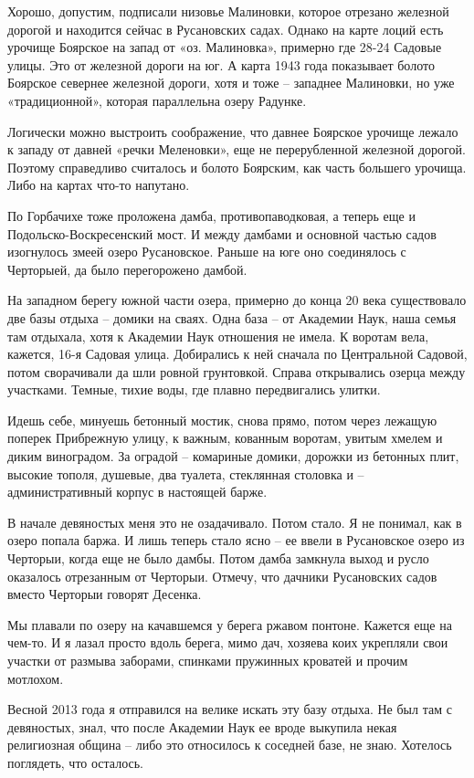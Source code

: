 Хорошо, допустим, подписали низовье Малиновки, которое отрезано железной дорогой и находится сейчас в Русановских садах. Однако на карте лоций есть урочище Боярское на запад от «оз. Малиновка», примерно где 28-24 Садовые улицы. Это от железной дороги на юг. А карта 1943 года показывает болото Боярское севернее железной дороги, хотя и тоже – западнее Малиновки, но уже «традиционной», которая параллельна озеру Радунке.

Логически можно выстроить соображение, что давнее Боярское урочище лежало к западу от давней «речки Меленовки», еще не перерубленной железной дорогой. Поэтому справедливо считалось и болото Боярским, как часть большего урочища. Либо на картах что-то напутано.

По Горбачихе тоже проложена дамба, противопаводковая, а теперь еще и Подольско-Воскресенский мост. И между дамбами и основной частью садов изогнулось змеей озеро Русановское. Раньше на юге оно соединялось с Черторыей, да было перегорожено дамбой.

На западном берегу южной части озера, примерно до конца 20 века существовало две базы отдыха – домики на сваях. Одна база – от Академии Наук, наша семья там отдыхала, хотя к Академии Наук отношения не имела. К воротам вела, кажется, 16-я Садовая улица. Добирались к ней сначала по Центральной Садовой, потом сворачивали да шли ровной грунтовкой. Справа открывались озерца между участками. Темные, тихие воды, где плавно передвигались улитки.

Идешь себе, минуешь бетонный мостик, снова прямо, потом через лежащую поперек Прибрежную улицу, к важным, кованным воротам, увитым хмелем и диким виноградом. За оградой – комариные домики, дорожки из бетонных плит, высокие тополя, душевые, два туалета, стеклянная столовка и – административный корпус в настоящей барже.

В начале девяностых меня это не озадачивало. Потом стало. Я не понимал, как в озеро попала баржа. И лишь теперь стало ясно – ее ввели в Русановское озеро из Черторыи, когда еще не было дамбы. Потом дамба замкнула выход и русло оказалось отрезанным от Черторыи. Отмечу, что дачники Русановских садов вместо Черторыи говорят Десенка.

Мы плавали по озеру на качавшемся у берега ржавом понтоне. Кажется еще на чем-то. И я лазал просто вдоль берега, мимо дач, хозяева коих укрепляли свои участки от размыва заборами, спинками пружинных кроватей и прочим мотлохом.

Весной 2013 года я отправился на велике искать эту базу отдыха. Не был там с девяностых, знал, что после Академии Наук ее вроде выкупила некая религиозная община – либо это относилось к соседней базе, не знаю. Хотелось поглядеть, что осталось.

